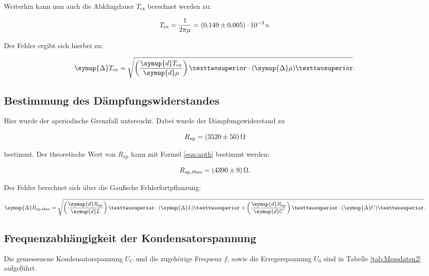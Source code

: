 Weiterhin kann nun auch die Abklingdauer $T_\text{ex}$ berechnet werden zu:

\begin{equation*}
T_\text{ex} = \frac{1}{2\pi\mu} = \SI{0.149+-0.005e-3}{\second}.
\end{equation*}

Der Fehler ergibt sich hierbei zu: 

\begin{equation*}
\symup{\Delta} T_\text{ex} = \sqrt{\left(\frac{\symup{d}T_\text{ex}}{\symup{d}\mu}\right)²\cdot (\symup{\Delta}\mu)²}.
\end{equation*}

\subsection{Bestimmung des Dämpfungswiderstandes}

Hier wurde der aperiodische Grenzfall untersucht. Dabei wurde der
Dämpfungswiderstand zu 

\begin{equation*}
R_\text{ap} = \SI{3520+-50}{\ohm}
\end{equation*}

bestimmt.
Der theoretische Wert von $R_\text{ap}$ kann mit Formel \eqref{eqn:apth} bestimmt 
werden: 

\begin{equation*}
R_\text{ap,theo} = \SI{4390+-9}{\ohm}.
\end{equation*}

Der Fehler berechnet sich über die Gaußsche Fehlerfortpflanzung: 

\begin{equation*}
\symup{\Delta} R_\text{ap,theo} = \sqrt{\left(\frac{\symup{d}R_\text{ap}}{\symup{d}L}\right)²\cdot (\symup{\Delta}L)² +
\left(\frac{\symup{d}R_\text{ap}}{\symup{d}C}\right)²\cdot (\symup{\Delta}C)²}.
\end{equation*}

\subsection{Frequenzabhängigkeit der Kondensatorspannung}

Die gemessenene Kondensatorspannung $U_C$ und die zugehörige Frequenz $f$, sowie
die Erregerspannung $U_0$ sind in Tabelle \ref{tab:Messdaten2} aufgeführt. 

